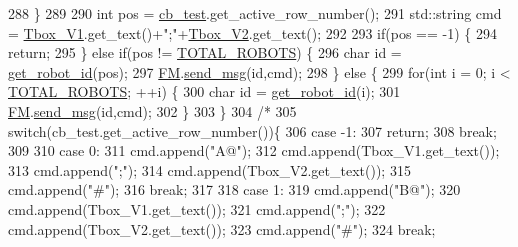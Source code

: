 \begin{DoxyCode}
288     \}
289 
290     \textcolor{keywordtype}{int} pos = \hyperlink{class_control_g_u_i_a93ab5972cf38d2cf8431cb375abc56e6}{cb\_test}.get\_active\_row\_number();
291     std::string cmd = \hyperlink{class_control_g_u_i_a8c9b9a41a7ac7de9a7c1c323f70e43b4}{Tbox\_V1}.get\_text()+\textcolor{stringliteral}{";"}+\hyperlink{class_control_g_u_i_ad4ec00b7d15236b0b8e6723e115c190a}{Tbox\_V2}.get\_text();
292 
293     \textcolor{keywordflow}{if}(pos == -1) \{
294         \textcolor{keywordflow}{return};
295     \} \textcolor{keywordflow}{else} \textcolor{keywordflow}{if}(pos != \hyperlink{class_control_g_u_i_a5a2c1a15c09444b56794705721ba73fa}{TOTAL\_ROBOTS}) \{
296         \textcolor{keywordtype}{char} \textcolor{keywordtype}{id} = \hyperlink{class_control_g_u_i_ae165819cbfce64d6604aac836faf9f1a}{get\_robot\_id}(pos);
297         \hyperlink{class_control_g_u_i_a16612b604257a888faac7a1d7e9e3e51}{FM}.\hyperlink{class_flying_messenger_a6cb8e42cf99c0a11afbb441db28864a3}{send\_msg}(\textcolor{keywordtype}{id},cmd);
298     \} \textcolor{keywordflow}{else} \{
299         \textcolor{keywordflow}{for}(\textcolor{keywordtype}{int} i = 0; i < \hyperlink{class_control_g_u_i_a5a2c1a15c09444b56794705721ba73fa}{TOTAL\_ROBOTS}; ++i) \{
300             \textcolor{keywordtype}{char} \textcolor{keywordtype}{id} = \hyperlink{class_control_g_u_i_ae165819cbfce64d6604aac836faf9f1a}{get\_robot\_id}(i);
301             \hyperlink{class_control_g_u_i_a16612b604257a888faac7a1d7e9e3e51}{FM}.\hyperlink{class_flying_messenger_a6cb8e42cf99c0a11afbb441db28864a3}{send\_msg}(\textcolor{keywordtype}{id},cmd);
302         \}
303     \}
304     \textcolor{comment}{/*}
305 \textcolor{comment}{    switch(cb\_test.get\_active\_row\_number())\{}
306 \textcolor{comment}{        case -1:}
307 \textcolor{comment}{        return;}
308 \textcolor{comment}{        break;}
309 \textcolor{comment}{}
310 \textcolor{comment}{        case 0:}
311 \textcolor{comment}{        cmd.append("A@");}
312 \textcolor{comment}{        cmd.append(Tbox\_V1.get\_text());}
313 \textcolor{comment}{        cmd.append(";");}
314 \textcolor{comment}{        cmd.append(Tbox\_V2.get\_text());}
315 \textcolor{comment}{        cmd.append("#");}
316 \textcolor{comment}{        break;}
317 \textcolor{comment}{}
318 \textcolor{comment}{        case 1:}
319 \textcolor{comment}{        cmd.append("B@");}
320 \textcolor{comment}{        cmd.append(Tbox\_V1.get\_text());}
321 \textcolor{comment}{        cmd.append(";");}
322 \textcolor{comment}{        cmd.append(Tbox\_V2.get\_text());}
323 \textcolor{comment}{        cmd.append("#");}
324 \textcolor{comment}{        break;}

\end{DoxyCode}
